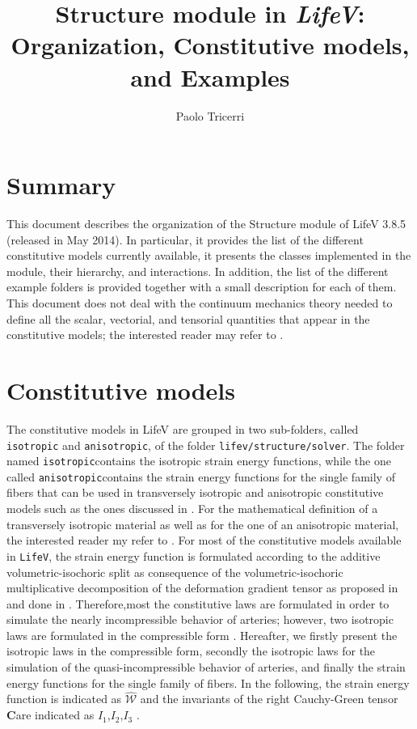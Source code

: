 \documentclass[a4paper, 10pt,twoside]{article}
\title{Structure module in \textit{LifeV}: Organization, Constitutive models, and Examples}
\author{Paolo Tricerri}
\theoremstyle{plain}
\theoremstyle{definition}
\theoremstyle{remark}
\newcommand{\WeNT}{\widehat{\mathcal{W}}}
\newcommand{\lv}{\texttt{LifeV}\space}
\newcommand{\C}{\textbf{C}}
\newcommand{\iso}{\texttt{isotropic}}
\begin{document}


\maketitle

\section*{Summary}
This document describes the organization of the Structure module of LifeV 3.8.5 (released in May 2014). In particular, it provides the list of the different constitutive models currently available, it presents the classes implemented in the module, their hierarchy, and  interactions. In addition, the list of the different example folders is provided together with a small description for each of them. This document does not deal with the continuum mechanics theory needed to define all the scalar, vectorial, and tensorial quantities that appear in the constitutive models; the interested reader may refer to \cite{book::Holzapfel2000}.

\section{Constitutive models}
The constitutive models in LifeV are grouped in two sub-folders, called \texttt{isotropic} and \texttt{anisotropic}, of the folder \texttt{lifev/structure/solver}. The folder named \iso\space contains the isotropic strain energy functions, while the one called \texttt{anisotropic}\space contains the strain energy functions for the single family of fibers that can be used in transversely isotropic and anisotropic constitutive models such as the ones discussed in \cite{thesis::Tricerri}. For the mathematical definition of a transversely isotropic material as well as for the one of an anisotropic material, the interested reader my refer to \cite{book::Holzapfel2000}. For most of the constitutive models available in \lv, the strain energy function is formulated according to the additive volumetric-isochoric split as consequence of the volumetric-isochoric multiplicative decomposition of the deformation gradient tensor as proposed in \cite{paper::Flory1956} and done in \cite{thesis::Tricerri}. Therefore,most the constitutive laws are formulated in order to simulate the nearly incompressible behavior of arteries; however, two isotropic laws are formulated in the compressible form \cite{book::Holzapfel2000,thesis::Tricerri}. Hereafter, we firstly present the isotropic laws in the compressible form, secondly the isotropic laws for the simulation of the quasi-incompressible behavior of arteries, and finally the strain energy functions for the single family of fibers. In the following, the strain energy function is indicated as $\WeNT$ and the invariants of the right Cauchy-Green tensor \C\space are indicated as $I_{1}$,$I_{2}$,$I_{3}$ \cite{book::Holzapfel2000}.
\end{document}
